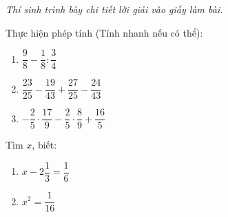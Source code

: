 \documentclass[12pt,a4paper]{article}
\begin{document}
\textit{Thí sinh trình bày chi tiết lời giải vào giấy làm bài.}

\vspace{1mm}
\begin{ex}
Thực hiện phép tính (Tính nhanh nếu có thể):
\begin{enumerate}[label=\textbf{\alph*)}, leftmargin=0.8cm, itemsep=1pt]
\item $\dfrac{9}{8} - \dfrac{1}{8} : \dfrac{3}{4}$
\item $\dfrac{23}{25} - \dfrac{19}{43} + \dfrac{27}{25} - \dfrac{24}{43}$
\item $-\dfrac{2}{5} \cdot \dfrac{17}{9} - \dfrac{2}{5} \cdot \dfrac{8}{9} + \dfrac{16}{5}$
\end{enumerate}
\end{ex}
\vspace{1.5mm}

\begin{ex}
Tìm $x$, biết:
\begin{enumerate}[label=\textbf{\alph*)}, leftmargin=0.8cm, itemsep=1pt]
\item $x - 2\dfrac{1}{3} = \dfrac{1}{6}$
\item $x^2 = \dfrac{1}{16}$
\end{enumerate}
\end{ex}
\vspace{1.5mm}
\end{document}
